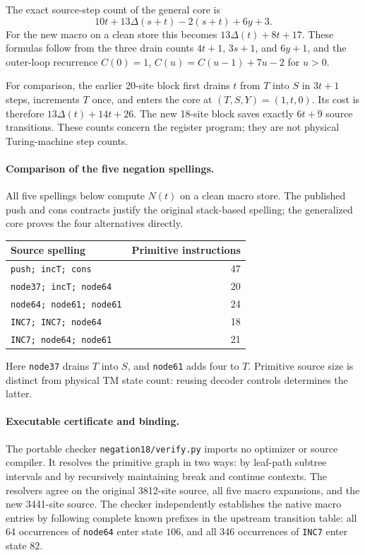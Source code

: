 The exact source-step count of the general core is
\[
 10t+13\Delta(s+t)-2(s+t)+6y+3.
\]
For the new macro on a clean store this becomes
$13\Delta(t)+8t+17$. These formulas follow from the three drain counts
$4t+1$, $3s+1$, and $6y+1$, and the outer-loop recurrence
$C(0)=1$, $C(u)=C(u-1)+7u-2$ for $u>0$.

For comparison, the earlier 20-site block first drains $t$ from $T$ into $S$ in $3t+1$ steps, increments $T$ once, and enters the core at $(T,S,Y)=(1,t,0)$. Its cost is therefore $13\Delta(t)+14t+26$. The new 18-site block saves exactly $6t+9$ source transitions. These counts concern the register program; they are not physical Turing-machine step counts.

\paragraph{Comparison of the five negation spellings.}
All five spellings below compute $N(t)$ on a clean macro store. The
published push and cons contracts justify the original stack-based
spelling; the generalized core proves the four alternatives directly.
\begin{center}
\begin{tabular}{lr}
\hline
Source spelling & Primitive instructions\\
\hline
\texttt{push; incT; cons} & 47\\
\texttt{node37; incT; node64} & 20\\
\texttt{node64; node61; node61} & 24\\
\texttt{INC7; INC7; node64} & 18\\
\texttt{INC7; node64; node61} & 21\\
\hline
\end{tabular}
\end{center}
Here \texttt{node37} drains $T$ into $S$, and \texttt{node61} adds four
to $T$. Primitive source size is distinct from physical TM state count:
reusing decoder controls determines the latter.

\paragraph{Executable certificate and binding.}
The portable checker \texttt{negation18/verify.py} imports no optimizer
or source compiler. It resolves the primitive graph in two ways: by
leaf-path subtree intervals and by recursively maintaining break and
continue contexts. The resolvers agree on the original 3812-site
source, all five macro expansions, and the new 3441-site source.
The checker independently establishes the native macro entries by
following complete known prefixes in the upstream transition table:
all 64 occurrences of \texttt{node64} enter state $106$, and all 346
occurrences of \texttt{INC7} enter state $82$.

